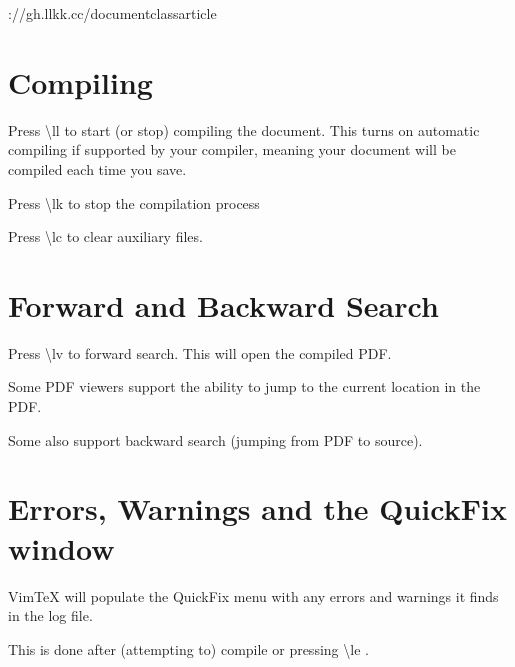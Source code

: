 \https://gh.llkk.cc/documentclass{article}

\usepackage{amsmath}
\newcommand{\lt}{\textbackslash{}lt }
\newcommand{\lk}{\textbackslash{}lk }
\newcommand{\lv}{\textbackslash{}lv }
\newcommand{\lc}{\textbackslash{}lc }
\renewcommand{\ll}{\textbackslash{}ll }
\renewcommand{\le}{\textbackslash{}le }



\section{Compiling}

Press \ll to start (or stop) compiling the document.
This turns on automatic compiling if supported by your compiler, meaning your
document will be compiled each time you save.

Press \lk to stop the compilation process

Press \lc to clear auxiliary files.














\section{Forward and Backward Search}

Press \lv to forward search. This will open the compiled PDF.

Some PDF viewers support the ability to jump to the current location in the PDF.

Some also support backward search (jumping from PDF to source).
















\section{Errors, Warnings and the QuickFix window}

VimTeX will populate the QuickFix menu with any errors and warnings it finds in
the log file.

This is done after (attempting to) compile or pressing \le.

